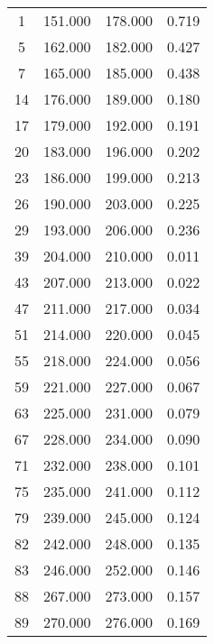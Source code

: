 % 
\begin{tabular}{cccc}
  \hline
  \hline
1 & 151.000 & 178.000 & 0.719 \\ 
  5 & 162.000 & 182.000 & 0.427 \\ 
  7 & 165.000 & 185.000 & 0.438 \\ 
  14 & 176.000 & 189.000 & 0.180 \\ 
  17 & 179.000 & 192.000 & 0.191 \\ 
  20 & 183.000 & 196.000 & 0.202 \\ 
  23 & 186.000 & 199.000 & 0.213 \\ 
  26 & 190.000 & 203.000 & 0.225 \\ 
  29 & 193.000 & 206.000 & 0.236 \\ 
  39 & 204.000 & 210.000 & 0.011 \\ 
  43 & 207.000 & 213.000 & 0.022 \\ 
  47 & 211.000 & 217.000 & 0.034 \\ 
  51 & 214.000 & 220.000 & 0.045 \\ 
  55 & 218.000 & 224.000 & 0.056 \\ 
  59 & 221.000 & 227.000 & 0.067 \\ 
  63 & 225.000 & 231.000 & 0.079 \\ 
  67 & 228.000 & 234.000 & 0.090 \\ 
  71 & 232.000 & 238.000 & 0.101 \\ 
  75 & 235.000 & 241.000 & 0.112 \\ 
  79 & 239.000 & 245.000 & 0.124 \\ 
  82 & 242.000 & 248.000 & 0.135 \\ 
  83 & 246.000 & 252.000 & 0.146 \\ 
  88 & 267.000 & 273.000 & 0.157 \\ 
  89 & 270.000 & 276.000 & 0.169 \\ 
   \hline
\end{tabular}

